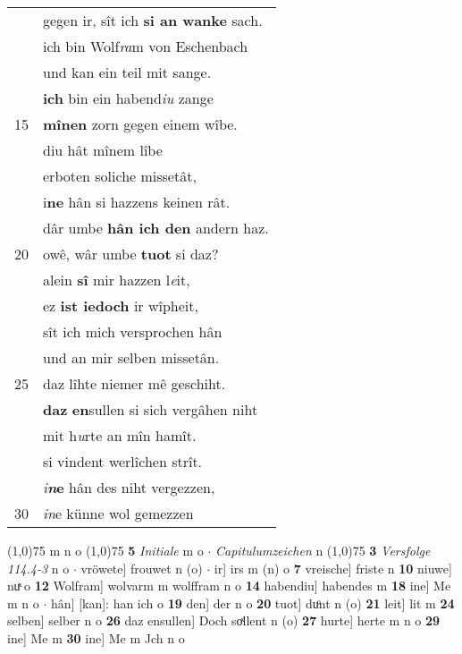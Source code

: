 \documentclass[8pt,a4paper,notitlepage]{article}
\begin{document}
\begin{table}[ht]
\begin{minipage}[t]{0.5\linewidth}
\begin{tabular}{rl}
 & gegen ir, sît ich \textbf{si an wanke} sach.\\ 
 & ich bin Wolf\textit{ra}m von Eschenbach\\ 
 & und kan ein teil mit sange.\\ 
 & \textbf{ich} bin ein habend\textit{iu} zange\\ 
15 & \textbf{mînen} zorn gegen einem wîbe.\\ 
 & diu hât mînem lîbe\\ 
 & erboten soliche missetât,\\ 
 & i\textbf{ne} hân si hazzens keinen rât.\\ 
 & dâr umbe \textbf{hân ich den} andern haz.\\ 
20 & owê, wâr umbe \textbf{tuot} si daz?\\ 
 & alein \textbf{sî} mir hazzen l\textit{e}it,\\ 
 & ez \textbf{ist iedoch} ir wîpheit,\\ 
 & sît ich mich versprochen hân\\ 
 & und an mir selben missetân.\\ 
25 & daz lîhte niemer mê geschiht.\\ 
 & \textbf{daz} \textbf{en}sullen si sich vergâhen niht\\ 
 & mit h\textit{u}rte an mîn hamît.\\ 
 & si vindent werlîchen strît.\\ 
 & \textit{i}\textbf{\textit{n}e} hân des niht vergezzen,\\ 
30 & \textit{in}e künne wol gemezzen\\ 
\end{tabular}
\scriptsize
\line(1,0){75} \newline
m n o \newline
\line(1,0){75} \newline
\textbf{5} \textit{Initiale} m o   $\cdot$ \textit{Capitulumzeichen} n  \newline
\line(1,0){75} \newline
\textbf{3} \textit{Versfolge 114.4-3} n o   $\cdot$ vröwete] frouwet n (o)  $\cdot$ ir] irs m (n) o \textbf{7} vreische] friste n \textbf{10} niuwe] nuͯ o \textbf{12} Wolfram] wolvarm m wolffram n o \textbf{14} habendiu] habendes m \textbf{18} ine] Me m n o  $\cdot$ hân] [kan]: han ich o \textbf{19} den] der n o \textbf{20} tuot] duͦnt n (o) \textbf{21} leit] lit m \textbf{24} selben] selber n o \textbf{26} daz ensullen] Doch soͯllent n (o) \textbf{27} hurte] herte m n o \textbf{29} ine] Me m \textbf{30} ine] Me m Jch n o \newline
\end{minipage}
\end{table}
\end{document}

